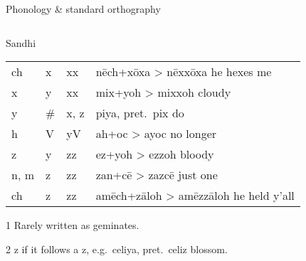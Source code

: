\documentclass[12pt]{beamer}
\newcommand{\nah}[1]{\textcolor{nahgrn}{#1}}
\newcommand{\trs}[1]{\textcolor{nahblu}{#1}}
\begin{document}
\begin{frame}
\begin{columns}[t]
\begin{column}{.22\linewidth}
\begin{block}{Phonology \& standard orthography}
\begin{threeparttable}
\begin{tablenotes}
\begin{frame}
\begin{columns}[t]
\begin{column}{.25\linewidth}
\begin{block}{Sandhi}
\begin{threeparttable}
\begin{tabular}{l@{+}l@{>}ll}
            \nah{ch} & \nah{x} & \nah{xx}\tnote{1} & \nah{nēch}+\nah{xōxa} > \nah{nēxxōxa} \trs{he hexes me} \\
            \nah{x} & \nah{y} & \nah{xx}\tnote{1} & \nah{mix}+\nah{yoh} > \nah{mixxoh} \trs{cloudy} \\
            \nah{y} & \nah{\#} & \nah{x, z}\tnote{2}{} & \nah{piya}, pret.~\nah{pix} \trs{do} \\
            \nah{h} & \nah{V} & \nah{yV} & \nah{ah}+\nah{oc} > \nah{ayoc} \trs{no longer} \\
            \nah{z} & \nah{y} & \nah{zz}\tnote{1} & \nah{ez}+\nah{yoh} > \nah{ezzoh} \trs{bloody} \\
            \nah{n, m} & \nah{z} & \nah{zz}\tnote{1} & \nah{zan}+\nah{cē} > \nah{zazcē} \trs{just one} \\
            \nah{ch} & \nah{z} & \nah{zz}\tnote{1} & \nah{amēch}+\nah{zāloh} > \nah{amēzzāloh} \trs{he held y'all} \\
          \end{tabular}%
          \begin{tablenotes}
          \item[1] Rarely written as geminates.
          \item[2] \nah{z} if it follows a \nah{z}, e.g.~\nah{celiya}, pret.~\nah{celiz} \trs{blossom}.
            
          \end{tablenotes}
        \end{threeparttable}
      \end{block}
      

\end{column}
\end{columns}
\end{frame}
\end{tablenotes}
\end{threeparttable}
\end{block}
\end{column}
\end{columns}
\end{frame}
\end{document}
